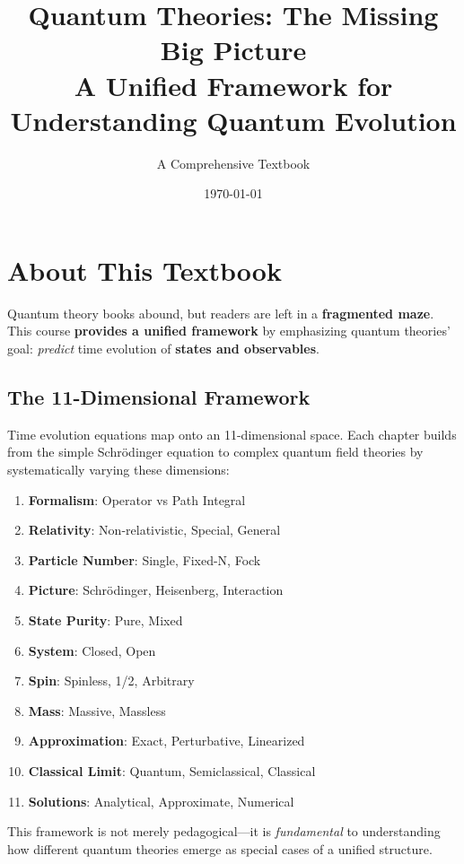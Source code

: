 \documentclass[12pt,openany,oneside]{book}
\title{\textbf{Quantum Theories: The Missing Big Picture} \\
       \Large A Unified Framework for Understanding Quantum Evolution}
\author{A Comprehensive Textbook}
\date{\today}
\begin{document}
\frontmatter

\maketitle

\newpage
\section*{About This Textbook}

Quantum theory books abound, but readers are left in a \textbf{fragmented maze}. This course \textbf{provides a unified framework} by emphasizing quantum theories' goal: \textit{predict} time evolution of \textbf{states and observables}.

\subsection*{The 11-Dimensional Framework}

Time evolution equations map onto an 11-dimensional space. Each chapter builds from the simple Schrödinger equation to complex quantum field theories by systematically varying these dimensions:

\begin{enumerate}
  \item \textbf{Formalism}: Operator vs Path Integral
  \item \textbf{Relativity}: Non-relativistic, Special, General
  \item \textbf{Particle Number}: Single, Fixed-N, Fock
  \item \textbf{Picture}: Schrödinger, Heisenberg, Interaction
  \item \textbf{State Purity}: Pure, Mixed
  \item \textbf{System}: Closed, Open
  \item \textbf{Spin}: Spinless, 1/2, Arbitrary
  \item \textbf{Mass}: Massive, Massless
  \item \textbf{Approximation}: Exact, Perturbative, Linearized
  \item \textbf{Classical Limit}: Quantum, Semiclassical, Classical
  \item \textbf{Solutions}: Analytical, Approximate, Numerical
\end{enumerate}

This framework is not merely pedagogical—it is \textit{fundamental} to understanding how different quantum theories emerge as special cases of a unified structure.
\end{document}
